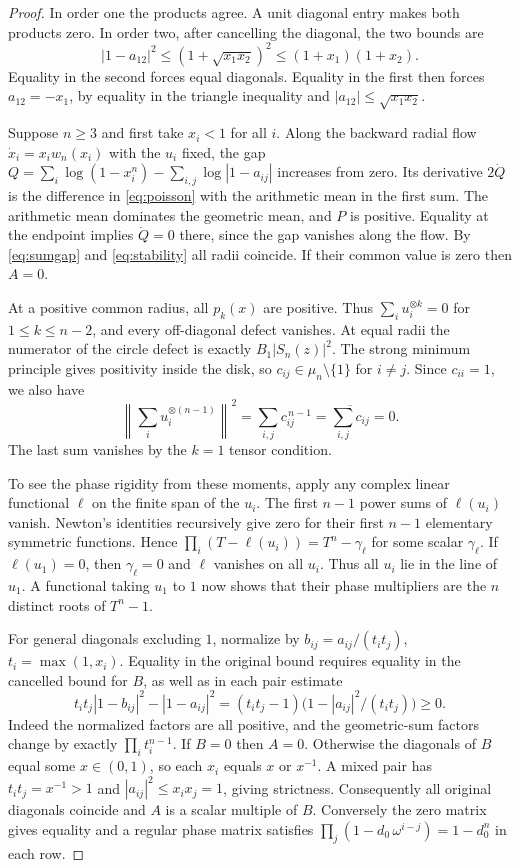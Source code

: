 \documentclass[10pt,twoside,reqno]{amsart}
\numberwithin{equation}{section}
\begin{document}
\begin{proof}
In order one the products agree. A unit diagonal entry makes both products
zero. In order two, after
cancelling the diagonal, the two bounds are
\[
 |1-a_{12}|^2\le (1+\sqrt{x_1x_2})^2\le (1+x_1)(1+x_2).
\]
Equality in the second forces equal diagonals. Equality in the first then
forces \(a_{12}=-x_1\), by equality in the triangle inequality and
\(|a_{12}|\le\sqrt{x_1x_2}\).

Suppose \(n\ge3\) and first take \(x_i<1\) for all \(i\). Along the
backward radial flow \(\dot x_i=x_iw_n(x_i)\) with the \(u_i\) fixed, the gap
\(Q=\sum_i\log(1-x_i^n)-\sum_{i,j}\log|1-a_{ij}|\) increases from zero.
Its derivative \(2\dot Q\) is the difference in \eqref{eq:poisson} with
the arithmetic mean in the first sum. The arithmetic mean dominates the
geometric mean, and \(P\) is positive. Equality at the endpoint implies
\(\dot Q=0\) there, since the gap vanishes along the flow. By
\eqref{eq:sumgap} and \eqref{eq:stability} all radii coincide.
If their common value is zero then \(A=0\).

At a positive common radius, all \(p_k(x)\) are positive. Thus
\(\sum_i u_i^{\otimes k}=0\) for \(1\le k\le n-2\), and every off-diagonal
defect vanishes. At equal radii the numerator of the circle defect is
exactly \(B_1|S_n(z)|^2\). The strong minimum principle gives positivity
inside the disk, so \(c_{ij}\in\mu_n\setminus\{1\}\) for \(i\ne j\).
Since \(c_{ii}=1\), we also have
\[
 \left\|\sum_i u_i^{\otimes(n-1)}\right\|^2
   =\sum_{i,j}c_{ij}^{\,n-1}=\overline{\sum_{i,j}c_{ij}}=0.
\]
The last sum vanishes by the \(k=1\) tensor condition.

To see the phase rigidity from these moments, apply any complex linear
functional \(\ell\) on the finite span of the \(u_i\).
The first \(n-1\) power sums of \(\ell(u_i)\) vanish.
Newton's identities recursively give zero for their first \(n-1\)
elementary symmetric functions. Hence \(\prod_i(T-\ell(u_i))=T^n-\gamma_\ell\)
for some scalar \(\gamma_\ell\). If \(\ell(u_1)=0\), then
\(\gamma_\ell=0\) and \(\ell\) vanishes on all \(u_i\).
Thus all \(u_i\) lie in the line of \(u_1\). A functional taking \(u_1\) to
\(1\) now shows that their phase multipliers are the \(n\) distinct roots
of \(T^n-1\).

For general diagonals excluding \(1\), normalize by
\(b_{ij}=a_{ij}/(t_it_j)\), \(t_i=\max(1,x_i)\).
Equality in the original bound requires equality in the cancelled bound
for \(B\), as well as in each pair estimate
\[
 t_it_j|1-b_{ij}|^2-|1-a_{ij}|^2
 =(t_it_j-1)\bigl(1-|a_{ij}|^2/(t_it_j)\bigr)\ge0 .
\]
Indeed the normalized factors are all positive, and the geometric-sum
factors change by exactly \(\prod_i t_i^{n-1}\). If \(B=0\) then \(A=0\).
Otherwise the diagonals of \(B\) equal some \(x\in(0,1)\), so each \(x_i\)
equals \(x\) or \(x^{-1}\). A mixed pair has \(t_it_j=x^{-1}>1\) and
\(|a_{ij}|^2\le x_i x_j=1\), giving strictness. Consequently all original
diagonals coincide and \(A\) is a scalar multiple of \(B\).
Conversely the zero matrix gives equality and a regular phase matrix
satisfies \(\prod_j(1-d_0\,\omega^{i-j})=1-d_0^n\) in each row.
\end{proof}
\end{document}
